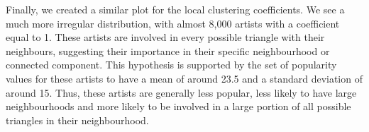 Finally, we created a similar plot for the local clustering coefficients. We see a much more irregular distribution, with almost 8,000 artists with a coefficient equal to 1. These artists are involved in every possible triangle with their neighbours, suggesting their importance in their specific neighbourhood or connected component. This hypothesis is supported by the set of popularity values for these artists to have a mean of around 23.5 and a standard deviation of around 15. Thus, these artists are generally less popular, less likely to have large neighbourhoods and more likely to be involved in a large portion of all possible triangles in their neighbourhood.
